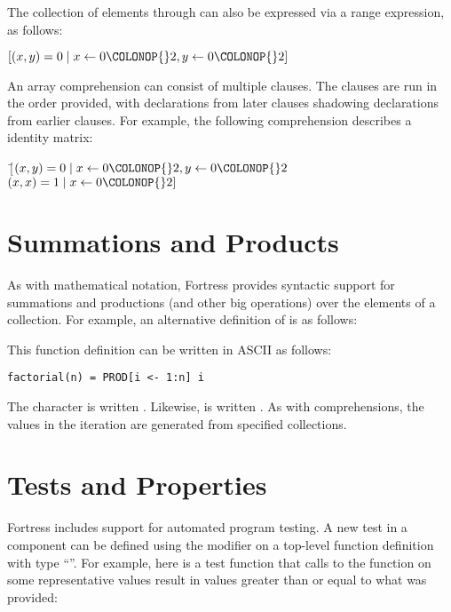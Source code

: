 The collection of elements  through  can also be expressed via a range expression, as follows:
\begin{Fortress}
\([(x,y) = 0 \mid x \leftarrow 0\COLONOP{}2, y \leftarrow 0\COLONOP{}2]\)
\end{Fortress}

An array comprehension can consist of multiple clauses. The clauses are run in the order provided,
with declarations from later clauses shadowing declarations from earlier clauses. For example, the following
comprehension describes a  identity matrix:

\begin{Fortress}
\(\ [ \)\pushtabs\=\+\((x,y) = 0 \mid x \leftarrow 0\COLONOP{}2, y \leftarrow 0\COLONOP{}2\)\\
\( (x,x) = 1 \mid x \leftarrow 0\COLONOP{}2]\)\-\\\poptabs
\end{Fortress}



\section{Summations and Products}
As with mathematical notation, Fortress provides syntactic support for
summations and productions (and other big operations) over the elements of a collection.
For example, an alternative definition of  is as follows:



This function definition can be written in ASCII as follows:

\begin{verbatim}
factorial(n) = PROD[i <- 1:n] i
\end{verbatim}

The character \EXP{\prod} is written .  Likewise,
\EXP{\sum} is written .
As with comprehensions, the values in the iteration are generated from specified collections.

\label{overviewTest}
\section{Tests and Properties}
Fortress includes support for automated program testing.
A new test in a component can be defined using the  modifier
on a top-level function definition with type ``\EXP{()\rightarrow()}''.
For example, here is a test function that calls to the 
function on some representative values
result in values greater than or equal to what was provided:


